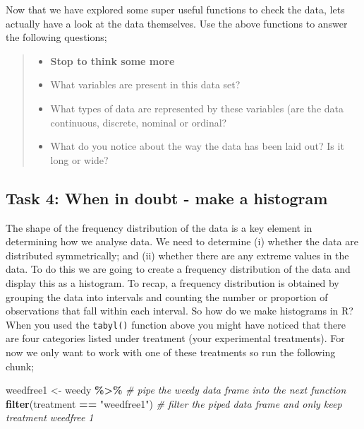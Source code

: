 \documentclass[
]{book}
\newenvironment{Shaded}{\begin{snugshade}}{\end{snugshade}}
\newcommand{\CommentTok}[1]{\textcolor[rgb]{0.56,0.35,0.01}{\textit{#1}}}
\newcommand{\FunctionTok}[1]{\textcolor[rgb]{0.13,0.29,0.53}{\textbf{#1}}}
\newcommand{\NormalTok}[1]{#1}
\newcommand{\OtherTok}[1]{\textcolor[rgb]{0.56,0.35,0.01}{#1}}
\newcommand{\SpecialCharTok}[1]{\textcolor[rgb]{0.81,0.36,0.00}{\textbf{#1}}}
\newcommand{\StringTok}[1]{\textcolor[rgb]{0.31,0.60,0.02}{#1}}
\providecommand{\tightlist}{%
  \setlength{\itemsep}{0pt}\setlength{\parskip}{0pt}}
\begin{document}
Now that we have explored some super useful functions to check the data, lets actually have a look at the data themselves. Use the above functions to answer the following questions;

\begin{quote}
\begin{itemize}
\tightlist
\item
  \textbf{Stop to think some more}
\item
  What variables are present in this data set?
\item
  What types of data are represented by these variables (are the data continuous, discrete, nominal or ordinal?
\item
  What do you notice about the way the data has been laid out? Is it long or wide?
\end{itemize}
\end{quote}

\subsection{Task 4: When in doubt - make a histogram}\label{histogram}

The shape of the frequency distribution of the data is a key element in determining how we analyse data. We need to determine (i) whether the data are distributed symmetrically; and (ii) whether there are any extreme values in the data. To do this we are going to create a frequency distribution of the data and display this as a histogram. To recap, a frequency distribution is obtained by grouping the data into intervals and counting the number or proportion of observations that fall within each interval.
So how do we make histograms in R? When you used the \texttt{tabyl()} function above you might have noticed that there are four categories listed under treatment (your experimental treatments). For now we only want to work with one of these treatments so run the following chunk;

\begin{Shaded}
\begin{Highlighting}[]
\NormalTok{weedfree1 }\OtherTok{\textless{}{-}}\NormalTok{ weedy }\SpecialCharTok{\%\textgreater{}\%} \CommentTok{\# pipe the weedy data frame into the next function }
  \FunctionTok{filter}\NormalTok{(treatment }\SpecialCharTok{==} \StringTok{"weedfree1"}\NormalTok{) }\CommentTok{\# filter the piped data frame and only keep treatment weedfree 1}
\end{Highlighting}
\end{Shaded}
\end{document}
